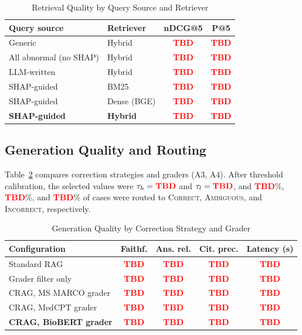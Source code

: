 \documentclass[conference]{IEEEtran}
\newcommand{\tbd}{\textcolor{red}{\textbf{TBD}}}
\begin{document}
\begin{table}[!t]
\caption{Retrieval Quality by Query Source and Retriever}
\label{tab:retr}
\centering
\footnotesize
\begin{tabular}{@{}llcc@{}}
\toprule
Query source & Retriever & nDCG@5 & P@5 \\
\midrule
Generic & Hybrid & \tbd & \tbd \\
All abnormal (no SHAP) & Hybrid & \tbd & \tbd \\
LLM-written & Hybrid & \tbd & \tbd \\
\midrule
SHAP-guided & BM25 & \tbd & \tbd \\
SHAP-guided & Dense (BGE) & \tbd & \tbd \\
\textbf{SHAP-guided} & \textbf{Hybrid} & \tbd & \tbd \\
\bottomrule
\end{tabular}
\end{table}

\subsection{Generation Quality and Routing}
Table~\ref{tab:gen} compares correction strategies and graders (A3, A4).
After threshold calibration, the selected values were $\tau_h=\tbd$ and
$\tau_l=\tbd$, and \tbd\%, \tbd\%, and \tbd\% of cases were routed to
\textsc{Correct}, \textsc{Ambiguous}, and \textsc{Incorrect},
respectively. %

\begin{table}[!t]
\caption{Generation Quality by Correction Strategy and Grader}
\label{tab:gen}
\centering
\footnotesize
\setlength{\tabcolsep}{3pt}
\begin{tabular}{@{}lcccc@{}}
\toprule
Configuration & Faithf. & Ans. rel. & Cit. prec. & Latency (s) \\
\midrule
Standard RAG & \tbd & \tbd & \tbd & \tbd \\
Grader filter only & \tbd & \tbd & \tbd & \tbd \\
CRAG, MS MARCO grader & \tbd & \tbd & \tbd & \tbd \\
CRAG, MedCPT grader & \tbd & \tbd & \tbd & \tbd \\
\textbf{CRAG, BioBERT grader} & \tbd & \tbd & \tbd & \tbd \\
\bottomrule
\end{tabular}
\end{table}
\end{document}
